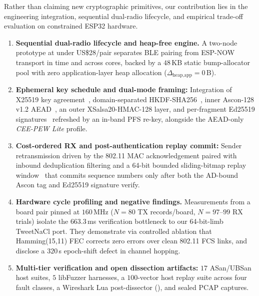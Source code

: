 \documentclass[conference]{IEEEtran}
\begin{document}
Rather than claiming new cryptographic primitives, our contribution lies in the engineering integration, sequential dual-radio lifecycle, and empirical trade-off evaluation on constrained ESP32 hardware.
\begin{enumerate}
\setlength{\itemsep}{0pt}\setlength{\parskip}{0pt}
\item \textbf{Sequential dual-radio lifecycle and heap-free engine.} A two-node prototype at under US\$28/pair separates BLE pairing from ESP-NOW transport in time and across cores, backed by a $48$\,KB static bump-allocator pool with zero application-layer heap allocation ($\Delta_{\text{heap,app}} = 0$\,B).
\item \textbf{Ephemeral key schedule and dual-mode framing:} Integration of X25519 key agreement~\cite{rfc7748}, domain-separated HKDF-SHA256~\cite{rfc5869}, inner Ascon-128 v1.2 AEAD~\cite{dobraunig2021}, an outer XSalsa20-HMAC-128 layer, and per-fragment Ed25519 signatures~\cite{bernstein2012} refreshed by an in-band PFS re-key, alongside the AEAD-only \textit{CEE-PEW Lite} profile.
\item \textbf{Cost-ordered RX and post-authentication replay commit:} Sender retransmission driven by the 802.11 MAC acknowledgement paired with inbound deduplication filtering and a 64-bit bounded sliding-bitmap replay window~\cite{donenfeld2017} that commits sequence numbers only after both the AD-bound Ascon tag and Ed25519 signature verify.
\item \textbf{Hardware cycle profiling and negative findings.} Measurements from a board pair pinned at $160$\,MHz ($N=80$ TX records/board, $N{=}97$--$99$ RX trials) isolate the $663.3$\,ms verification bottleneck to our 64-bit-limb TweetNaCl port. They demonstrate via controlled ablation that Hamming(15,11) FEC corrects zero errors over clean 802.11 FCS links, and disclose a $320$\,s epoch-shift defect in channel hopping.
\item \textbf{Multi-tier verification and open dissection artifacts:} $17$ ASan/UBSan host suites, $5$ libFuzzer harnesses, a $100$-vector host replay suite across four fault classes, a Wireshark Lua post-dissector (), and sealed PCAP captures.
\end{enumerate}
\end{document}
